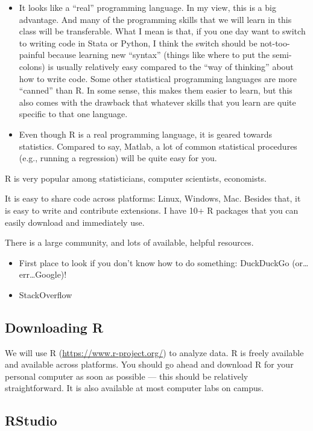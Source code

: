 \documentclass[
  letterpaper,
  DIV=11,
  numbers=noendperiod]{scrreprt}
\begin{document}
\begin{itemize}
\item
  It looks like a ``real'' programming language. In my view, this is a
  big advantage. And many of the programming skills that we will learn
  in this class will be transferable. What I mean is that, if you one
  day want to switch to writing code in Stata or Python, I think the
  switch should be not-too-painful because learning new ``syntax''
  (things like where to put the semi-colons) is usually relatively easy
  compared to the ``way of thinking'' about how to write code. Some
  other statistical programming languages are more ``canned'' than R. In
  some sense, this makes them easier to learn, but this also comes with
  the drawback that whatever skills that you learn are quite specific to
  that one language.
\item
  Even though R is a real programming language, it is geared towards
  statistics. Compared to say, Matlab, a lot of common statistical
  procedures (e.g., running a regression) will be quite easy for you.
\end{itemize}

R is very popular among statisticians, computer scientists, economists.

It is easy to share code across platforms: Linux, Windows, Mac. Besides
that, it is easy to write and contribute extensions. I have 10+ R
packages that you can easily download and immediately use.

There is a large community, and lots of available, helpful resources.

\begin{itemize}
\item
  First place to look if you don't know how to do something: DuckDuckGo
  (or\ldots err\ldots Google)!
\item
  StackOverflow
\end{itemize}

\subsection{Downloading R}\label{downloading-r}

We will use R (\url{https://www.r-project.org/}) to analyze data. R is
freely available and available across platforms. You should go ahead and
download R for your personal computer as soon as possible --- this
should be relatively straightforward. It is also available at most
computer labs on campus.

\subsection{RStudio}\label{rstudio}
\end{document}
